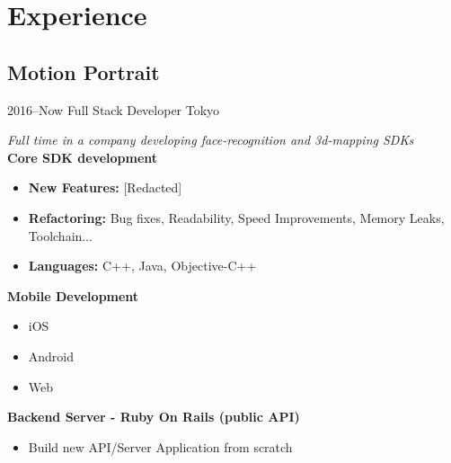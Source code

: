 \documentclass[]{template/friggeri-cv} %
\begin{document}

\section{Experience}


\subsection{Motion Portrait}
\begin{entrylist}


\entry
{2016--Now}
{Full Stack Developer}
{Tokyo}
{\emph{Full time in a company developing face-recognition and 3d-mapping SDKs}\\
\textbf{Core SDK development} 
\begin{itemize}
\item \textbf{New Features:} [Redacted]
\item \textbf{Refactoring:} Bug fixes, Readability, Speed Improvements, Memory Leaks, Toolchain...
\item \textbf{Languages:} C++, Java, Objective-C++

\end{itemize}
\textbf{Mobile Development} 
\begin{itemize}
\item iOS
\item Android
\item Web
\end{itemize}

\textbf{Backend Server - Ruby On Rails (public API)} 
\begin{itemize}
\item Build new API/Server Application from scratch
\end{itemize}
}
\end{entrylist}

\end{document}
